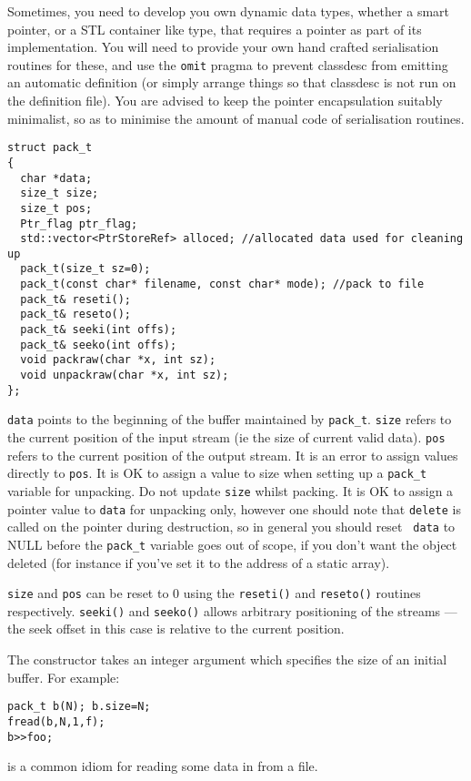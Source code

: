 
Sometimes, you need to develop you own dynamic data types, whether a
smart pointer, or a STL container like type, that requires a pointer
as part of its implementation. You will need to provide your own hand
crafted serialisation routines for these, and use the {\tt omit}
pragma to prevent classdesc from emitting an
automatic definition (or simply arrange things so that classdesc is
not run on the definition file). You are advised to keep the pointer
encapsulation suitably minimalist, so as to minimise the amount of
manual code of serialisation routines.


\begin{verbatim}
struct pack_t
{
  char *data;
  size_t size;
  size_t pos;
  Ptr_flag ptr_flag;
  std::vector<PtrStoreRef> alloced; //allocated data used for cleaning up 
  pack_t(size_t sz=0);
  pack_t(const char* filename, const char* mode); //pack to file
  pack_t& reseti();
  pack_t& reseto();
  pack_t& seeki(int offs);
  pack_t& seeko(int offs);
  void packraw(char *x, int sz); 
  void unpackraw(char *x, int sz);
};
\end{verbatim}

\verb+data+ points to the beginning of the buffer maintained by
\verb+pack_t+. \verb+size+ refers to the current position of the input
stream (ie the size of current valid data). \verb+pos+ refers to the
current position of the output stream. It is an error to assign values
directly to {\tt pos}. It is OK to assign a value to size when setting
up a \verb+pack_t+ variable for unpacking. Do not update {\tt size}
whilst packing. It is OK to assign a pointer value to {\tt data} for
unpacking only, however one should note that {\tt delete} is called on
the pointer during destruction, so in general you should reset {\tt
data} to NULL before the \verb+pack_t+ variable goes out of scope, if
you don't want the object deleted (for instance if you've set it to
the address of a static array).

{\tt size} and {\tt pos} can be reset to 0 using the {\tt reseti()} and
{\tt reseto()} routines respectively. {\tt seeki()} and {\tt seeko()}
allows arbitrary positioning of the streams --- the seek offset in
this case is relative to the current position.

The constructor takes an integer argument which specifies the size of
an initial buffer. For example:
\begin{verbatim}
pack_t b(N); b.size=N;
fread(b,N,1,f);
b>>foo;
\end{verbatim}
is a common idiom for reading some data in from a file.

